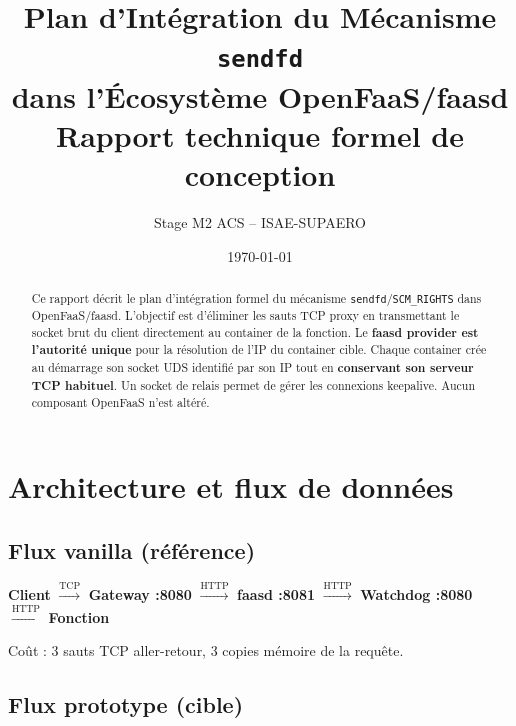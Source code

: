 \documentclass[11pt,a4paper]{article}
\title{
    \vspace{-1cm}
    \textbf{Plan d'Intégration du Mécanisme \texttt{sendfd} \\
    dans l'Écosystème OpenFaaS/faasd}\\[0.5em]
    \large Rapport technique formel de conception
}
\author{Stage M2 ACS -- ISAE-SUPAERO}
\date{\today}
\begin{document}
\maketitle
\thispagestyle{fancy}



\newcommand{\actionbox}[1]{%
  \vspace{0.35em}%
  \noindent\colorbox{gray!12}{\parbox{\dimexpr\linewidth-2\fboxsep\relax}{%
    \small\textbf{$\Rightarrow$ Action :} #1}}%
  \vspace{0.35em}%
}

\begin{abstract}
Ce rapport décrit le plan d'intégration formel du mécanisme \texttt{sendfd}/\texttt{SCM\_RIGHTS}
dans OpenFaaS/faasd. L'objectif est d'éliminer les sauts TCP proxy en transmettant le socket brut
du client directement au container de la fonction. Le \textbf{faasd provider est l'autorité unique}
pour la résolution de l'IP du container cible. Chaque container crée au démarrage son socket UDS
identifié par son IP tout en \textbf{conservant son serveur TCP habituel}. Un socket de relais
permet de gérer les connexions keepalive. Aucun composant OpenFaaS n'est altéré.
\end{abstract}

\tableofcontents\newpage

\section{Architecture et flux de données}

\subsection{Flux vanilla (référence)}
\textbf{Client} $\xrightarrow{\text{TCP}}$ \textbf{Gateway :8080}
$\xrightarrow{\text{HTTP}}$ \textbf{faasd :8081}
$\xrightarrow{\text{HTTP}}$ \textbf{Watchdog :8080}
$\xrightarrow{\text{HTTP}}$ \textbf{Fonction}

Coût : 3 sauts TCP aller-retour, 3 copies mémoire de la requête.

\subsection{Flux prototype (cible)}
\end{document}
